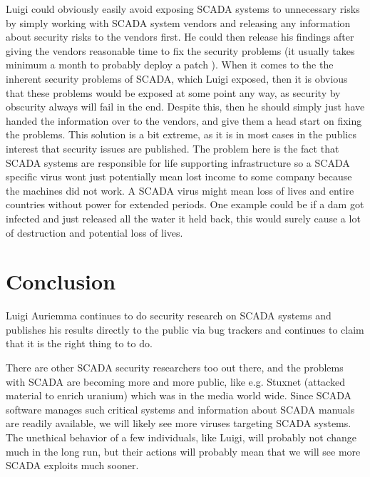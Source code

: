 Luigi could obviously easily avoid exposing SCADA systems to unnecessary risks by simply working with SCADA system vendors and releasing any information about security risks to the vendors first. He could then release his findings after giving the vendors reasonable time to fix the security problems (it usually takes minimum a month to probably deploy a patch \cite{v13}). 
When it comes to the the inherent security problems of SCADA, which Luigi exposed, then it is obvious that these problems would be exposed at some point any way, as security by obscurity always will fail in the end. Despite this, then he should simply just have handed the information over to the vendors, and give them a head start on fixing the problems. This solution is a bit extreme, as it is in most cases in the publics interest that security issues are published. The problem here is the fact that SCADA systems are responsible for life supporting infrastructure so a SCADA specific virus wont just potentially mean lost income to some company because the machines did not work. A SCADA virus might mean loss of lives and entire countries without power for extended periods. One example could be if a dam got infected and just released all the water it held back, this would surely cause a lot of destruction and potential loss of lives.


\section{Conclusion}

Luigi Auriemma continues to do security research on SCADA systems and publishes his results directly to the public via bug trackers \cite{v5, v1} and continues to claim that it is the right thing to to do.

There are other SCADA security researchers too out there, and the problems with SCADA are becoming more and more public, like e.g. Stuxnet \cite{v4} (attacked material to enrich uranium)  which was in the media world wide. Since SCADA software manages such critical systems and information about SCADA manuals are readily available, we will likely see more viruses targeting SCADA systems. The unethical behavior of a few individuals, like Luigi, will probably not change much in the long run, but their actions will probably mean that we will see more SCADA exploits much sooner.





